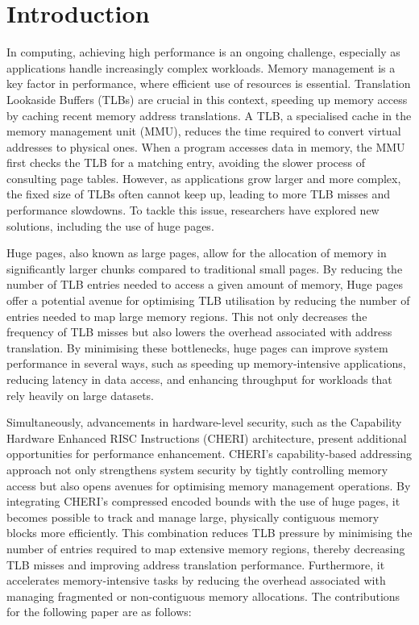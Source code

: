 \documentclass[11pt]{article}
\author{Akilan}
\date{\today}
\title{}
\begin{document}
\tableofcontents

\section{Introduction}
\label{sec:org01b31aa}
In computing, achieving high performance is an ongoing challenge, especially as 
applications handle increasingly complex workloads. Memory management is a key factor 
in performance, where efficient use of resources is essential. Translation Lookaside 
Buffers (TLBs) are crucial in this context, speeding up memory access by caching recent 
memory address translations. A TLB, a specialised cache in the memory management unit (MMU), 
reduces the time required to convert virtual addresses to physical ones. When a program accesses 
data in memory, the MMU first checks the TLB for a matching entry, avoiding the slower process of 
consulting page tables. However, as applications grow larger and more complex, the fixed size of 
TLBs often cannot keep up, leading to more TLB misses and performance slowdowns\cite{mittal_survey_2017}. 
To tackle this issue, researchers have explored new solutions, including the use of 
huge pages\cite{panwar_hawkeye_2019}.

Huge pages, also known as large pages, allow for the allocation of memory in significantly larger chunks 
compared to traditional small pages. By reducing the number of TLB entries needed to access a given amount 
of memory, Huge pages offer a potential avenue for optimising TLB utilisation by reducing the number 
of entries needed to map large memory regions. This not only decreases the frequency of 
TLB misses but also lowers the overhead associated with address translation. By minimising 
these bottlenecks, huge pages can improve system performance in several ways, such as speeding 
up memory-intensive applications, reducing latency in data access, and enhancing throughput for 
workloads that rely heavily on large datasets. 

Simultaneously, advancements in hardware-level security, such as the Capability Hardware Enhanced RISC Instructions (CHERI)
\cite{woodruff_cheri_2014} architecture, present additional opportunities for performance enhancement. CHERI's capability-based addressing approach not 
only strengthens system security by tightly controlling memory access but also opens avenues for optimising memory management 
operations. By integrating CHERI’s compressed\cite{woodruff_cheri_2019} encoded bounds with the use of huge pages, it becomes possible to track and manage 
large, physically contiguous memory blocks more efficiently. This combination reduces TLB pressure by minimising the number of 
entries required to map extensive memory regions, thereby decreasing TLB misses and improving address translation performance. 
Furthermore, it accelerates memory-intensive tasks by reducing the overhead associated with managing fragmented or non-contiguous 
memory allocations. The contributions for the following paper are as follows:
\end{document}
